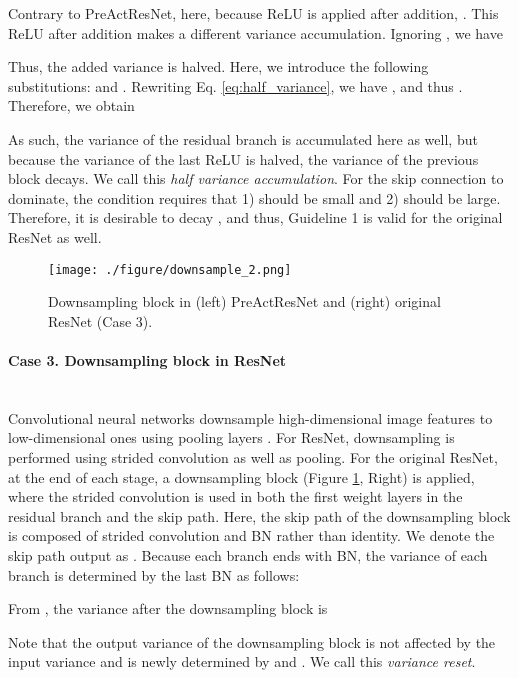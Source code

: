 \documentclass{article}
\begin{document}
Contrary to PreActResNet, here, because ReLU is applied after addition, . This ReLU after addition makes a different variance accumulation. Ignoring , we have


Thus, the added variance is halved. Here, we introduce the following substitutions:  and . Rewriting Eq. \ref{eq:half_variance}, we have , and thus . Therefore, we obtain


As such, the variance of the residual branch is accumulated here as well, but because the variance of the last ReLU is halved, the variance of the previous block decays. We call this \emph{half variance accumulation}. For the skip connection to dominate, the condition  requires that 1)  should be small and 2)  should be large. Therefore, it is desirable to decay , and thus, Guideline 1 is valid for the original ResNet as well.

\begin{figure}[t!]
	\centering
    \texttt{[image: ./figure/downsample\_2.png]}
\caption{Downsampling block in (left) PreActResNet and (right) original ResNet (Case 3).}
	\label{fig:downsample}
\end{figure}

\paragraph{Case 3. Downsampling block in ResNet} \ \\
Convolutional neural networks downsample high-dimensional image features to low-dimensional ones using pooling layers \cite{DBLP:conf/nips/KrizhevskySH12}. For ResNet, downsampling is performed using strided convolution \cite{DBLP:journals/corr/SpringenbergDBR14} as well as pooling. For the original ResNet, at the end of each stage, a downsampling block (Figure \ref{fig:downsample}, Right) is applied, where the strided convolution is used in both the first weight layers in the residual branch and the skip path. Here, the skip path of the downsampling block is composed of strided convolution and BN rather than identity. We denote the skip path output as . Because each branch ends with BN, the variance of each branch is determined by the last BN as follows:


From , the variance after the downsampling block is

Note that the output variance of the downsampling block is not affected by the input variance and is newly determined by  and . We call this \emph{variance reset}.
\end{document}
